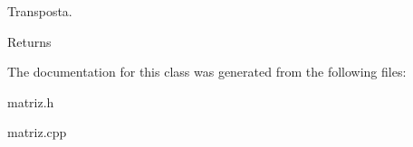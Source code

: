 Transposta. 

\begin{DoxyReturn}{Returns}

\end{DoxyReturn}


The documentation for this class was generated from the following files\+:\begin{DoxyCompactItemize}
\item 
matriz.\+h\item 
matriz.\+cpp\end{DoxyCompactItemize}

